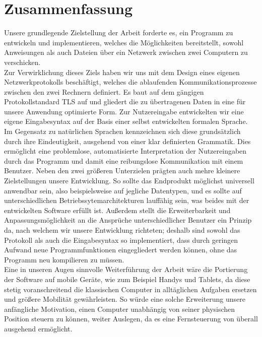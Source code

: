%

%
\section*{Zusammenfassung}
Unsere grundlegende Zielstellung der Arbeit forderte es, ein Programm zu entwickeln und implementieren, welches die Möglichkeiten bereitstellt, sowohl Anweisungen als auch Dateien über ein Netzwerk zwischen zwei Computern zu verschicken.\\
Zur Verwirklichung dieses Ziels haben wir uns mit dem Design eines eigenen Netzwerkprotokolls beschäftigt, welches die ablaufenden Kommunikationsprozesse zwischen den zwei Rechnern definiert. 
Es baut auf dem gängigen Protokollstandard TLS auf und gliedert die zu übertragenen Daten in eine für unsere Anwendung optimierte Form. 
Zur Nutzereingabe entwickelten wir eine eigene Eingabesyntax auf der Basis einer selbst entwickelten formalen Sprache. 
Im Gegensatz zu natürlichen Sprachen kennzeichnen sich diese grundsätzlich durch ihre Eindeutigkeit, ausgehend von einer klar definierten Grammatik. 
Dies ermöglicht eine problemlose, automatisierte Interpretation der Nutzereingaben durch das Programm und damit eine reibungslose Kommunikation mit einem Benutzer.
Neben den zwei größeren Unterzielen prägten auch mehre kleinere Zielstellungen unsere Entwicklung.
So sollte das Endprodukt möglichst universell anwendbar sein, also beispielsweise auf jegliche Datentypen, und es sollte auf unterschiedlichen Betriebssytemarchitekturen lauffähig sein, was beides mit der entwickelten Software erfüllt ist.
Außerdem stellt die Erweiterbarkeit und Anpassungsmöglichkeit an die Ansprüche unterschiedlicher Benutzer ein Prinzip da, nach welchem wir unsere Entwicklung richteten; deshalb sind sowohl das Protokoll als auch die Eingabesyntax so implementiert, dass durch geringen Aufwand neue Programmfunktionen eingegliedert werden können, ohne das Programm neu kompilieren zu müssen.\\
Eine in unseren Augen sinnvolle Weiterführung der Arbeit wäre die Portierung der Software auf mobile Geräte, wie zum Beispiel Handys und Tablets, da diese stetig voranschreitend die klassischen Computer in alltäglichen Aufgaben ersetzen und größere Mobilität gewährleisten. 
So würde eine solche Erweiterung unsere anfängliche Motivation, einen Computer unabhängig von seiner physischen Position steuern zu können, weiter Auslegen, da es eine Fernsteuerung von überall ausgehend ermöglicht. 
